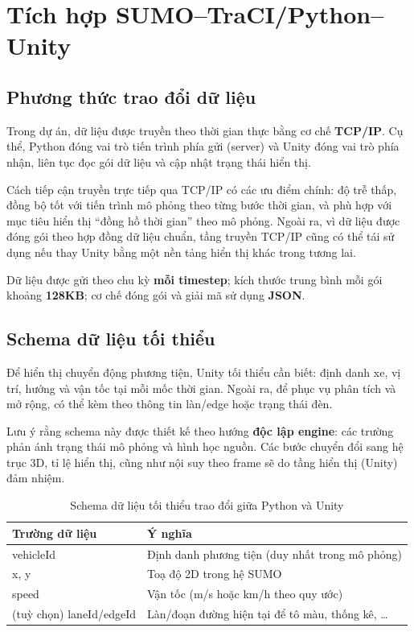 \documentclass[../DoAn.tex]{subfiles}
\begin{document}
\section{Tích hợp SUMO--TraCI/Python--Unity}
\subsection{Phương thức trao đổi dữ liệu}
Trong dự án, dữ liệu được truyền theo thời gian thực bằng cơ chế \textbf{TCP/IP}. Cụ thể, Python đóng vai trò tiến trình phía gửi (server) và Unity đóng vai trò phía nhận, liên tục đọc gói dữ liệu và cập nhật trạng thái hiển thị.

Cách tiếp cận truyền trực tiếp qua TCP/IP có các ưu điểm chính: độ trễ thấp, đồng bộ tốt với tiến trình mô phỏng theo từng bước thời gian, và phù hợp với mục tiêu hiển thị ``đồng hồ thời gian'' theo mô phỏng. Ngoài ra, vì dữ liệu được đóng gói theo hợp đồng dữ liệu chuẩn, tầng truyền TCP/IP cũng có thể tái sử dụng nếu thay Unity bằng một nền tảng hiển thị khác trong tương lai.

Dữ liệu được gửi theo chu kỳ \textbf{mỗi timestep}; kích thước trung bình mỗi gói khoảng \textbf{128KB}; cơ chế đóng gói và giải mã sử dụng \textbf{JSON}.

\subsection{Schema dữ liệu tối thiểu}
Để hiển thị chuyển động phương tiện, Unity tối thiểu cần biết: định danh xe, vị trí, hướng và vận tốc tại mỗi mốc thời gian. Ngoài ra, để phục vụ phân tích và mở rộng, có thể kèm theo thông tin làn/edge hoặc trạng thái đèn.

Lưu ý rằng schema này được thiết kế theo hướng \textbf{độc lập engine}: các trường phản ánh trạng thái mô phỏng và hình học nguồn. Các bước chuyển đổi sang hệ trục 3D, tỉ lệ hiển thị, cũng như nội suy theo frame sẽ do tầng hiển thị (Unity) đảm nhiệm.

\begin{table}[H]
	\centering
	\caption{Schema dữ liệu tối thiểu trao đổi giữa Python và Unity}
	\label{tab:data-schema}
	\begin{tabular}{p{} p{}}
		\hline
		\textbf{Trường dữ liệu} & \textbf{Ý nghĩa}\\
		\hline
		vehicleId & Định danh phương tiện (duy nhất trong mô phỏng)\\
		x, y & Toạ độ 2D trong hệ SUMO\\
		speed & Vận tốc (m/s hoặc km/h theo quy ước)\\
		(tuỳ chọn) laneId/edgeId & Làn/đoạn đường hiện tại để tô màu, thống kê, \ldots\\
		\hline
	\end{tabular}
\end{table}
\end{document}
